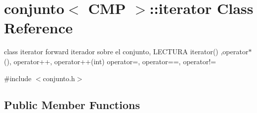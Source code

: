 \hypertarget{classconjunto_1_1iterator}{}\section{conjunto$<$ C\+M\+P $>$\+:\+:iterator Class Reference}
\label{classconjunto_1_1iterator}


class iterator forward iterador sobre el conjunto, L\+E\+C\+T\+U\+R\+A iterator() ,operator$\ast$(), operator++, operator++(int) operator=, operator==, operator!=  




{\ttfamily \#include $<$conjunto.\+h$>$}

\subsection*{Public Member Functions}
